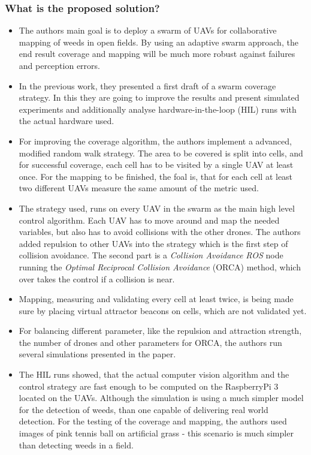     \subsubsection*{What is the proposed solution?}
    \begin{itemize}
        \item The authors main goal is to deploy a swarm of UAVs for collaborative mapping of weeds in open fields. By using an adaptive swarm approach, the end result coverage and mapping will be much more robust against failures and perception errors.
        \item In the previous work, they presented a first draft of a swarm coverage strategy. In this they are going to improve the results and present simulated experiments and additionally analyse hardware-in-the-loop (HIL) runs with the actual hardware used.
        \item For improving the coverage algorithm, the authors implement a advanced, modified random walk strategy. The area to be covered is split into cells, and for successful coverage, each cell has to be visited by a single UAV at least once. For the mapping to be finished, the foal is, that for each cell at least two different UAVs measure the same amount of the metric used.
        \item The strategy used, runs on every UAV in the swarm as the main high level control algorithm. Each UAV has to move around and map the needed variables, but also has to avoid collisions with the other drones. The authors added repulsion to other UAVs into the strategy which is the first step of collision avoidance. The second part is a \emph{Collision Avoidance ROS} node running the \emph{Optimal Reciprocal Collision Avoidance} (ORCA) method, which over takes the control if a collision is near. 
        \item Mapping, measuring and validating every cell at least twice, is being made sure by placing virtual attractor beacons on cells, which are not validated yet.
        \item For balancing different  parameter, like the repulsion and attraction strength, the number of drones and other parameters for ORCA, the authors run several simulations presented in the paper.
        \item The HIL runs showed, that the actual computer vision algorithm and the control strategy are fast enough to be computed on the RaspberryPi 3 located on the UAVs. Although the simulation is using a much simpler model for the detection of weeds, than one capable of delivering real world detection. For the testing of the coverage and mapping, the authors used images of pink tennis ball on artificial grass - this scenario is much simpler than detecting weeds in a field.
    \end{itemize}
